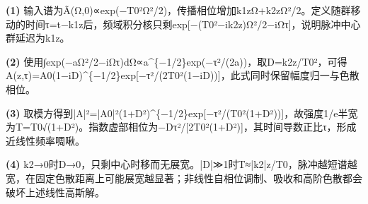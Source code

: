 \par\noindent\textbf{(1)} 输入谱为Ã(Ω,0)∝exp(−T0²Ω²/2)，传播相位增加k1zΩ+k2zΩ²/2。定义随群移动的时间τ=t−k1z后，频域积分核只剩exp[−(T0²−ik2z)Ω²/2−iΩτ]，说明脉冲中心群延迟为k1z。
\par\noindent\textbf{(2)} 使用∫exp(−aΩ²/2−iΩτ)dΩ∝a\textasciicircum{}\{−1/2\}exp(−τ²/(2a))，取D=k2z/T0²，可得A(z,τ)=A0(1−iD)\textasciicircum{}\{−1/2\}exp[−τ²/(2T0²(1−iD))]，此式同时保留幅度归一与色散相位。
\par\noindent\textbf{(3)} 取模方得到|A|²=|A0|²(1+D²)\textasciicircum{}\{−1/2\}exp[−τ²/(T0²(1+D²))]，故强度1/e半宽为T=T0√(1+D²)。指数虚部相位为−Dτ²/[2T0²(1+D²)]，其时间导数正比τ，形成近线性频率啁啾。
\par\noindent\textbf{(4)} k2→0时D→0，只剩中心时移而无展宽。|D|≫1时T≈|k2|z/T0，脉冲越短谱越宽，在固定色散距离上可能展宽越显著；非线性自相位调制、吸收和高阶色散都会破坏上述线性高斯解。

